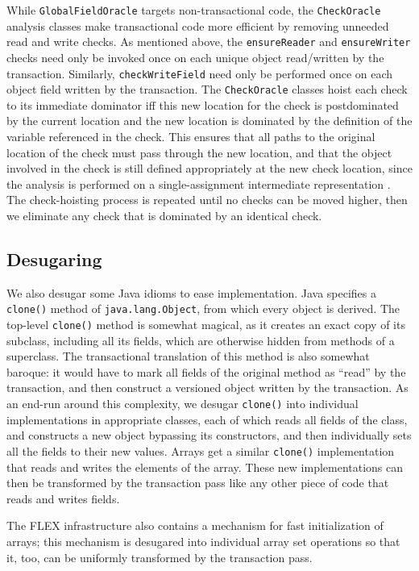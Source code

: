 While \texttt{GlobalFieldOracle} targets non-transactional code, the
\texttt{CheckOracle} analysis classes make transactional code more
efficient by removing unneeded read and write checks.  As mentioned
above, the \texttt{ensureReader} and \texttt{ensureWriter} checks need
only be invoked once on each unique object read/written by the
transaction.  Similarly, \texttt{checkWriteField} need only be
performed once on each object field written by the transaction.  The
\texttt{CheckOracle} classes hoist each check to its immediate
dominator iff this new location for the check is postdominated by the
current location and the new location is dominated by the definition
of the variable referenced in the check.  This ensures that all paths
to the original location of the check must pass through the new
location, and that the object involved in the check is still defined
appropriately at the new check location, since the analysis is
performed on a single-assignment intermediate representation
\cite{Ananian99}.  The check-hoisting process is repeated until no
checks can be moved higher, then we eliminate any check that is
dominated by an identical check.

\subsection{Desugaring} %
We also desugar some Java idioms to ease implementation.  Java
specifies a \texttt{clone()} method of \texttt{java.lang.Object},
from which every object is derived.  The top-level \texttt{clone()} method is
somewhat magical, as it creates an exact copy of its subclass,
including all its fields, which are otherwise hidden from methods of a
superclass.  The transactional translation of this method is also
somewhat baroque: it would have to mark all fields of the original
method as ``read'' by the transaction, and then construct a versioned
object written by the transaction.  As an end-run around this
complexity, we desugar \texttt{clone()} into individual
implementations in appropriate classes, each of which reads all fields
of the class, and constructs a new object bypassing its
constructors, and then individually sets all the fields to their new
values.  Arrays get a similar \texttt{clone()} implementation that
reads and writes the elements of the array.  These new implementations
can then be transformed by the transaction pass like any other piece
of code that reads and writes fields.

The FLEX infrastructure also contains a mechanism for fast
initialization of arrays; this mechanism is desugared into
individual array set operations so that it, too, can be uniformly
transformed by the transaction pass.

